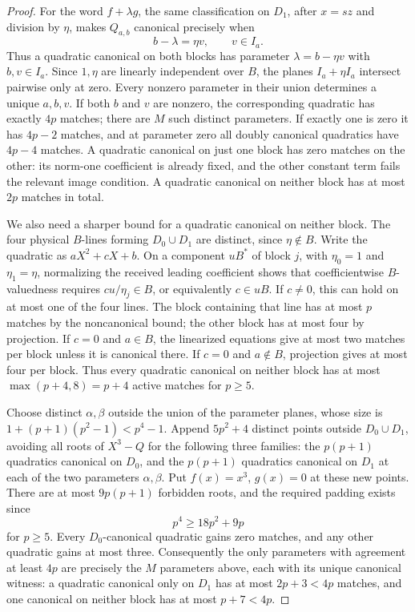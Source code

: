 \begin{proof}
For the word $f+\lambda g$, the same classification on $D_1$, after
$x=sz$ and division by $\eta$, makes $Q_{a,b}$ canonical precisely when
\[
 b-\lambda=\eta v,\qquad v\in I_a.
\]
Thus a quadratic canonical on both blocks has parameter
$\lambda=b-\eta v$ with $b,v\in I_a$. Since $1,\eta$ are linearly
independent over $B$, the planes $I_a+\eta I_a$ intersect pairwise only
at zero. Every nonzero parameter in their union determines a unique
$a,b,v$. If both $b$ and $v$ are nonzero, the corresponding quadratic
has exactly $4p$ matches; there are $M$ such distinct parameters.
If exactly one is zero it has $4p-2$ matches, and at parameter zero
all doubly canonical quadratics have $4p-4$ matches.
A quadratic canonical on just one block has zero matches on the other:
its norm-one coefficient is already fixed, and the other constant term
fails the relevant image condition. A quadratic canonical on neither
block has at most $2p$ matches in total.

We also need a sharper bound for a quadratic canonical on neither block.
The four physical $B$-lines forming $D_0\cup D_1$ are distinct, since
$\eta\notin B$. Write the quadratic as $aX^2+cX+b$.
On a component $uB^*$ of block $j$, with $\eta_0=1$ and $\eta_1=\eta$,
normalizing the received leading coefficient shows that coefficientwise
$B$-valuedness requires $cu/\eta_j\in B$, or equivalently $c\in uB$.
If $c\ne0$, this can hold on at most one of the four lines. The block
containing that line has at most $p$ matches by the noncanonical bound;
the other block has at most four by projection. If $c=0$ and $a\in B$,
the linearized equations give at most two matches per block unless it is
canonical there. If $c=0$ and $a\notin B$, projection gives at most four
per block. Thus every quadratic canonical on neither block has at most
$\max(p+4,8)=p+4$ active matches for $p\ge5$.

Choose distinct $\alpha,\beta$ outside the union of the parameter planes,
whose size is $1+(p+1)(p^2-1)<p^4-1$.
Append $5p^2+4$ distinct points outside $D_0\cup D_1$, avoiding all roots
of $X^3-Q$ for the following three families: the $p(p+1)$ quadratics
canonical on $D_0$, and the $p(p+1)$ quadratics canonical on $D_1$ at each
of the two parameters $\alpha,\beta$.
Put $f(x)=x^3$, $g(x)=0$ at these new points. There are at most
$9p(p+1)$ forbidden roots, and the required padding exists since
\[
 p^4\ge18p^2+9p
\]
for $p\ge5$. Every $D_0$-canonical quadratic gains zero matches, and
any other quadratic gains at most three. Consequently the only parameters
with agreement at least $4p$ are precisely the $M$ parameters above,
each with its unique canonical witness: a quadratic canonical only on
$D_1$ has at most $2p+3<4p$ matches, and one canonical on neither block
has at most $p+7<4p$.


\end{proof}
